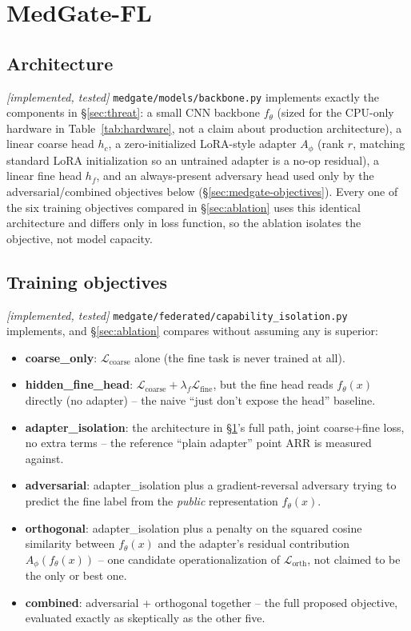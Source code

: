 \documentclass[11pt]{article}
\newcommand{\status}[1]{\textit{[#1]}}
\begin{document}
\section{MedGate-FL}
\label{sec:medgate}

\subsection{Architecture} \status{implemented, tested}
\texttt{medgate/models/backbone.py} implements exactly the components in
\S\ref{sec:threat}: a small CNN backbone $f_\theta$ (sized for the CPU-only
hardware in Table~\ref{tab:hardware}, not a claim about production
architecture), a linear coarse head $h_c$, a zero-initialized LoRA-style
adapter $A_\phi$ (rank $r$, matching standard LoRA initialization
\citep{hu2022lora} so an untrained adapter is a no-op residual), a linear
fine head $h_f$, and an always-present adversary head used only by the
adversarial/combined objectives below (\S\ref{sec:medgate-objectives}).
Every one of the six training objectives compared in
\S\ref{sec:ablation} uses this identical architecture and differs only in
loss function, so the ablation isolates the objective, not model capacity.

\subsection{Training objectives} \status{implemented, tested}
\label{sec:medgate-objectives}
\texttt{medgate/federated/capability\_isolation.py} implements, and
\S\ref{sec:ablation} compares without assuming any is superior:
\begin{itemize}[nosep]
\item \textbf{coarse\_only}: $\mathcal{L}_{\text{coarse}}$ alone (the fine
task is never trained at all).
\item \textbf{hidden\_fine\_head}: $\mathcal{L}_{\text{coarse}} +
\lambda_f \mathcal{L}_{\text{fine}}$, but the fine head reads $f_\theta(x)$
directly (no adapter) -- the naive ``just don't expose the head'' baseline.
\item \textbf{adapter\_isolation}: the architecture in
\S\ref{sec:medgate}'s full path, joint coarse+fine loss, no extra terms --
the reference ``plain adapter'' point ARR is measured against.
\item \textbf{adversarial}: adapter\_isolation plus a gradient-reversal
adversary trying to predict the fine label from the \emph{public}
representation $f_\theta(x)$.
\item \textbf{orthogonal}: adapter\_isolation plus a penalty on the squared
cosine similarity between $f_\theta(x)$ and the adapter's residual
contribution $A_\phi(f_\theta(x))$ -- one candidate operationalization of
$\mathcal{L}_{\text{orth}}$, not claimed to be the only or best one.
\item \textbf{combined}: adversarial + orthogonal together -- the full
proposed objective, evaluated exactly as skeptically as the other five.
\end{itemize}
\end{document}
